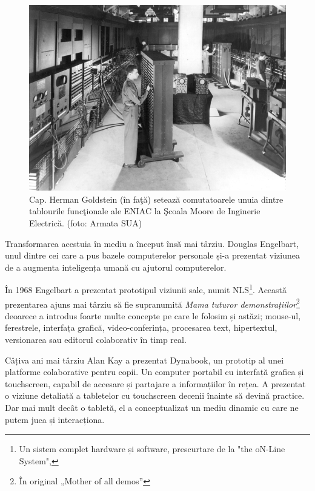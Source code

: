 \begin{figure}[h]
  \centering
  \includegraphics[scale=0.8]{img/eniac.jpg}
  \caption{Cap. Herman Goldstein (în faţă) setează comutatoarele unuia dintre tablourile funcţionale ale ENIAC la Şcoala Moore de Inginerie Electrică. (foto: Armata SUA)}
\end{figure}
\newpage

Transformarea acestuia în mediu a început însă mai târziu. Douglas Engelbart, unul dintre cei care a pus bazele computerelor personale și-a prezentat viziunea de a augmenta inteligența umană cu ajutorul computerelor.

În 1968 Engelbart a prezentat prototipul viziunii sale, numit NLS\footnote{Un sistem complet hardware și software, prescurtare de la "the oN-Line System", }.
Această prezentarea ajuns mai târziu să fie supranumită \textit{Mama tuturor demonstrațiilor}\footnote{În original „Mother of all demos”} deoarece a introdus foarte multe concepte pe care le folosim și astăzi; mouse-ul, ferestrele, interfața grafică, video-conferința, procesarea text, hipertextul, versionarea sau editorul colaborativ în timp real.

Câțiva ani mai târziu Alan Kay a prezentat Dynabook, un prototip al unei platforme colaborative pentru copii.
Un computer portabil cu interfață grafica și touchscreen, capabil de accesare și partajare a informațiilor în rețea. A prezentat o viziune detaliată a tabletelor cu touchscreen decenii înainte să devină practice. Dar mai mult decât o tabletă, el a conceptualizat un mediu dinamic cu care ne putem juca și interacționa.

